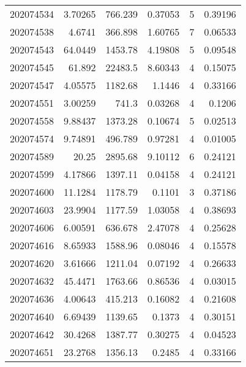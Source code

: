 \begin{tabular}{rrrrrr}
 202074534 &          3.70265 &      766.239  &            0.37053 &           5 & 0.39196 \\
 202074538 &          4.6741  &      366.898  &            1.60765 &           7 & 0.06533 \\
 202074543 &         64.0449  &     1453.78   &            4.19808 &           5 & 0.09548 \\
 202074545 &         61.892   &    22483.5    &            8.60343 &           4 & 0.15075 \\
 202074547 &          4.05575 &     1182.68   &            1.1446  &           4 & 0.33166 \\
 202074551 &          3.00259 &      741.3    &            0.03268 &           4 & 0.1206  \\
 202074558 &          9.88437 &     1373.28   &            0.10674 &           5 & 0.02513 \\
 202074574 &          9.74891 &      496.789  &            0.97281 &           4 & 0.01005 \\
 202074589 &         20.25    &     2895.68   &            9.10112 &           6 & 0.24121 \\
 202074599 &          4.17866 &     1397.11   &            0.04158 &           4 & 0.24121 \\
 202074600 &         11.1284  &     1178.79   &            0.1101  &           3 & 0.37186 \\
 202074603 &         23.9904  &     1177.59   &            1.03058 &           4 & 0.38693 \\
 202074606 &          6.00591 &      636.678  &            2.47078 &           4 & 0.25628 \\
 202074616 &          8.65933 &     1588.96   &            0.08046 &           4 & 0.15578 \\
 202074620 &          3.61666 &     1211.04   &            0.07192 &           4 & 0.26633 \\
 202074632 &         45.4471  &     1763.66   &            0.86536 &           4 & 0.03015 \\
 202074636 &          4.00643 &      415.213  &            0.16082 &           4 & 0.21608 \\
 202074640 &          6.69439 &     1139.65   &            0.1373  &           4 & 0.30151 \\
 202074642 &         30.4268  &     1387.77   &            0.30275 &           4 & 0.04523 \\
 202074651 &         23.2768  &     1356.13   &            0.2485  &           4 & 0.33166 \\

\end{tabular}
